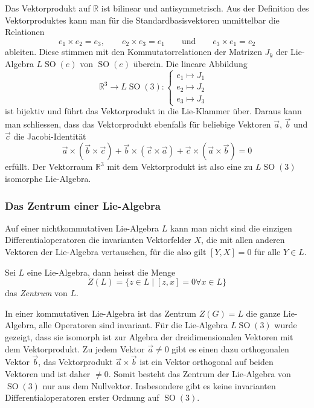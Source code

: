 \begin{beispiel}
Das Vektorprodukt auf $\mathbb{R}$ ist bilinear und antisymmetrisch.
Aus der Definition des Vektorproduktes kann man für die Standardbasisvektoren
unmittelbar die Relationen
\[
e_1\times e_2
=
e_3,
\qquad
e_2\times e_3
=
e_1
\qquad\text{und}\qquad
e_3\times e_1
=
e_2
\]
ableiten.
Diese stimmen mit den Kommutatorrelationen der Matrizen $J_k$ der
Lie-Algebra $L\operatorname{SO}(e)$ von $\operatorname{SO}(e)$ überein.
Die lineare Abbildung
\[
\mathbb{R}^3 \to L\operatorname{SO}(3):
\begin{cases}
e_1 \mapsto J_1&\\
e_2 \mapsto J_2&\\
e_3 \mapsto J_3&
\end{cases}
\]
ist bijektiv und
führt das Vektorprodukt in die Lie-Klammer über.
Daraus kann man schliessen, dass das Vektorprodukt ebenfalls für beliebige
Vektoren $\vec{a}$, $\vec{b}$ und $\vec{c}$ die Jacobi-Identität
\[
\vec{a}\times (\vec{b}\times\vec{c})
+
\vec{b}\times (\vec{c}\times\vec{a})
+
\vec{c}\times (\vec{a}\times\vec{b})
=
0
\]
erfüllt.
Der Vektorraum $\mathbb{R}^3$ mit dem Vektorprodukt ist also eine
zu $L\operatorname{SO}(3)$ isomorphe Lie-Algebra.
\end{beispiel}

%
%
\subsubsection{Das Zentrum einer Lie-Algebra}
Auf einer nichtkommutativen Lie-Algebra $L$ kann man nicht sind die einzigen
Differentialoperatoren die invarianten Vektorfelder $X$, die mit allen
anderen Vektoren der Lie-Algebra vertauschen, für die also gilt
$[Y,X]=0$ für alle $Y\in L$.

\begin{definition}
Sei $L$ eine Lie-Algebra, dann heisst die Menge
\[
Z(L)
=
\{z\in L\mid [z,x]=0\forall x\in L\}
\]
das {\em Zentrum} von $L$.
\end{definition}

In einer kommutativen Lie-Algebra ist das Zentrum $Z(G)=L$ die ganze
Lie-Algebra, alle Operatoren sind invariant.
Für die Lie-Algebra $L\operatorname{SO}(3)$ wurde gezeigt, dass sie
isomorph ist zur Algebra der dreidimensionalen Vektoren mit dem
Vektorprodukt.
Zu jedem Vektor $\vec{a}\ne 0$ gibt es einen dazu orthogonalen Vektor
$\vec{b}$, das Vektorprodukt $\vec{a}\times\vec{b}$ ist ein Vektor
orthogonal auf beiden Vektoren und ist daher $\ne 0$.
Somit besteht das Zentrum der Lie-Algebra von $\operatorname{SO}(3)$ nur
aus dem Nullvektor.
Insbesondere gibt es keine invarianten Differentialoperatoren erster
Ordnung auf $\operatorname{SO}(3)$.

